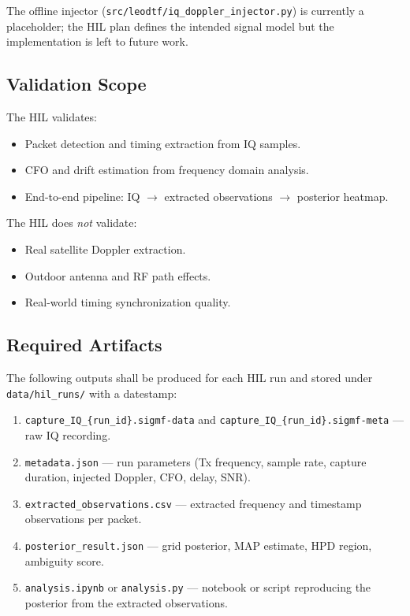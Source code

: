 The offline injector (\texttt{src/leodtf/iq\_doppler\_injector.py}) is currently
a placeholder; the HIL plan defines the intended signal model but the
implementation is left to future work.

\subsection{Validation Scope}
The HIL validates:
\begin{itemize}
  \item Packet detection and timing extraction from IQ samples.
  \item CFO and drift estimation from frequency domain analysis.
  \item End-to-end pipeline: IQ $\rightarrow$ extracted observations
        $\rightarrow$ posterior heatmap.
\end{itemize}
The HIL does \emph{not} validate:
\begin{itemize}
  \item Real satellite Doppler extraction.
  \item Outdoor antenna and RF path effects.
  \item Real-world timing synchronization quality.
\end{itemize}

\subsection{Required Artifacts}
The following outputs shall be produced for each HIL run and stored under
\texttt{data/hil\_runs/} with a datestamp:
\begin{enumerate}
  \item \texttt{capture\_IQ\_\{run\_id\}.sigmf-data} and
        \texttt{capture\_IQ\_\{run\_id\}.sigmf-meta} --- raw IQ recording.
  \item \texttt{metadata.json} --- run parameters (Tx frequency, sample rate,
        capture duration, injected Doppler, CFO, delay, SNR).
  \item \texttt{extracted\_observations.csv} --- extracted frequency and
        timestamp observations per packet.
  \item \texttt{posterior\_result.json} --- grid posterior, MAP estimate,
        HPD region, ambiguity score.
  \item \texttt{analysis.ipynb} or \texttt{analysis.py} --- notebook or script
        reproducing the posterior from the extracted observations.
\end{enumerate}

